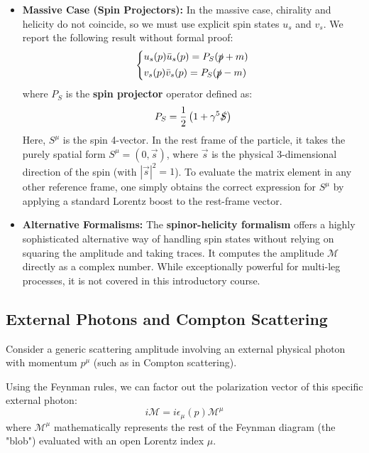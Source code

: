 \begin{itemize}
    \item \textbf{Massive Case (Spin Projectors):}
          In the massive case, chirality and helicity do not coincide, so we must use explicit spin states $u_s$ and $v_s$. We report the following result without formal proof:
          \[
              \begin{dcases}
                  u_s(p) \bar{u}_s(p) = P_S (\slashed{p} + m) \\
                  v_s(p) \bar{v}_s(p) = P_S (\slashed{p} - m)
              \end{dcases}
          \]
          where $P_S$ is the \textbf{spin projector} operator defined as:
          \[
              P_S = \frac{1}{2} \left( 1 + \gamma^5 \slashed{S} \right)
          \]
          Here, $S^\mu$ is the spin 4-vector. In the rest frame of the particle, it takes the purely spatial form $S^\mu = (0, \vec{s})$, where $\vec{s}$ is the physical 3-dimensional direction of the spin (with $|\vec{s}|^2 = 1$). To evaluate the matrix element in any other reference frame, one simply obtains the correct expression for $S^\mu$ by applying a standard Lorentz boost to the rest-frame vector.

    \item \textbf{Alternative Formalisms:}
          The \textbf{spinor-helicity formalism} offers a highly sophisticated alternative way of handling spin states without relying on squaring the amplitude and taking traces. It computes the amplitude $\mathcal{M}$ directly as a complex number. While exceptionally powerful for multi-leg processes, it is not covered in this introductory course.
\end{itemize}


\subsection{External Photons and Compton Scattering}

Consider a generic scattering amplitude involving an external physical photon with momentum $p^\mu$ (such as in Compton scattering).

Using the Feynman rules, we can factor out the polarization vector of this specific external photon:
\[
    i \mathcal{M} = i \epsilon_\mu(p) \mathcal{M}^\mu
\]
where $\mathcal{M}^\mu$ mathematically represents the rest of the Feynman diagram (the "blob") evaluated with an open Lorentz index $\mu$.

